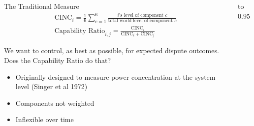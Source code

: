 \documentclass[final]{beamer}
\begin{document}
\begin{frame}{}
\begin{columns}
\begin{column}{.32\textwidth}
{        \vfill

        \begin{block}{The Traditional Measure}
          \vspace{-1em}
          \begin{gather*}
            \text{CINC}_i
            =
            \frac{1}{6} \sum_{c=1}^6 \frac{
              \text{$i$'s level of component $c$}
            }{
              \text{total world level of component $c$}
            }
            \\[0.5em]
            \text{Capability Ratio}_{i, j}
            =
            \frac{\text{CINC}_i}{\text{CINC}_i + \text{CINC}_j}
          \end{gather*}

          \bigskip%
          We want to control, as best as possible, for expected dispute
          outcomes.  Does the Capability Ratio do that?
          
          \begin{itemize}
            \item Originally designed to measure power concentration at the
            system level (Singer et al 1972)

            \item Components not weighted

            \item Inflexible over time
          \end{itemize}
        \end{block}
      }
    \end{column}

    \begin{column}{.32\textwidth}
      \vbox to 0.95
\end{column}
\end{columns}
\end{frame}
\end{document}

